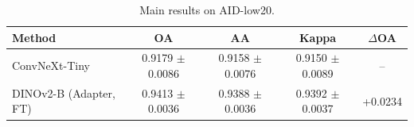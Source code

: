 \begin{table}[t]
  \centering
  \caption{Main results on AID-low20.}
  \label{tab:aid-low20_main}
  \begin{tabular}{l c c c c}
    \toprule
    Method & OA & AA & Kappa & $\Delta$OA \\
    \midrule
    ConvNeXt-Tiny & 0.9179 $\pm$ 0.0086 & 0.9158 $\pm$ 0.0076 & 0.9150 $\pm$ 0.0089 & -- \\
    DINOv2-B (Adapter, FT) & 0.9413 $\pm$ 0.0036 & 0.9388 $\pm$ 0.0036 & 0.9392 $\pm$ 0.0037 & +0.0234 \\
    \bottomrule
  \end{tabular}
\end{table}
